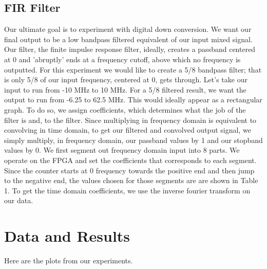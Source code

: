 \documentclass[12pt]{article}
\begin{document}
\subsection{FIR Filter}
Our ultimate goal is to experiment with digital down conversion. We want
our final output to be a low bandpass filtered equivalent of our input
mixed signal. Our filter, the finite impulse response filter, ideally, creates a
passband centered at 0 and 'abruptly' ends at a frequency cutoff, above
which no frequency is outputted. For this experiment we would like to
create a 5/8 bandpass filter; that is only 5/8 of our input frequency,
centered at 0, gets through. Let's take our input to run from -10
MHz to 10 MHz. For a 5/8 filtered result, we want the output to run
from -6.25 to 62.5 MHz. This would ideally appear as a rectangular
graph. To do so, we assign coefficients, which determines what the
job of the filter is and, to the filter. Since
multiplying in frequency domain is equivalent to convolving in time
domain, to get our filtered and convolved output signal, we simply
multiply, in frequency domain, our passband values by 1 and our stopband
values by 0. We first segment out frequency domain input into 8
parts. We operate on the FPGA and set the coefficients that corresponds
to each segment. Since the counter starts at 0 frequency towards the
positive end and then jump to the negative end, the values chosen for
those segments are are shown in Table 1. To get the time domain
coefficients, we use the inverse fourier transform on our data. 
\section{Data and Results}
Here are the plots from our experiments.
\end{document}

